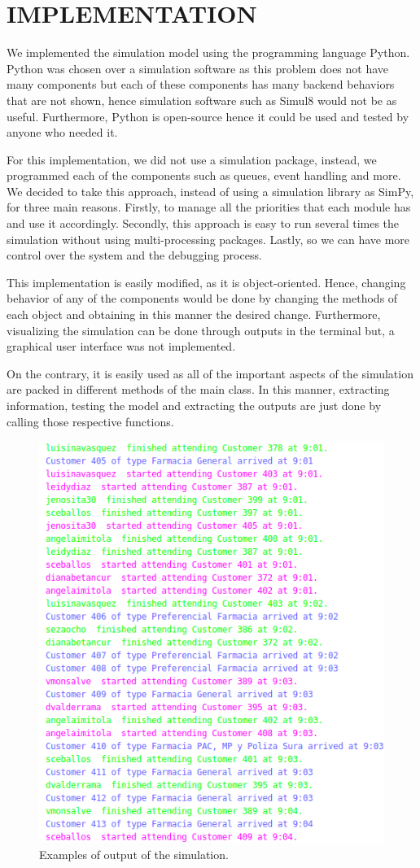 \section{IMPLEMENTATION}
We implemented the simulation model using the programming language Python. Python was chosen over a simulation software as this problem does not have many components but each of these components has many backend behaviors that are not shown, hence simulation software such as Simul8 would not be as useful. Furthermore, Python is open-source hence it could be used and tested by anyone who needed it.

For this implementation, we did not use a simulation package, instead, we programmed each of the components such as queues, event handling and more. We decided to take this approach, instead of using a simulation library as SimPy, for three main reasons. Firstly, to manage all the priorities that each module has and use it accordingly. Secondly, this approach is easy to run several times the simulation without using multi-processing packages. Lastly, so we can have more control over the system and the debugging process.

This implementation is easily modified, as it is object-oriented. Hence, changing behavior of any of the components would be done by changing the methods of each object and obtaining in this manner the desired change. Furthermore, visualizing the simulation can be done through outputs in the terminal but, a graphical user interface was not implemented. 

On the contrary, it is easily used as all of the important aspects of the simulation are packed in different methods of the main class. In this manner, extracting information, testing the model and extracting the outputs are just done by calling those respective functions. 

\begin{figure}
    \centering
    \includegraphics[scale=0.5]{files/screenshot_20191025_185940.png}
    \caption{Examples of output of the simulation.}
    \label{fig:implemen}
\end{figure}